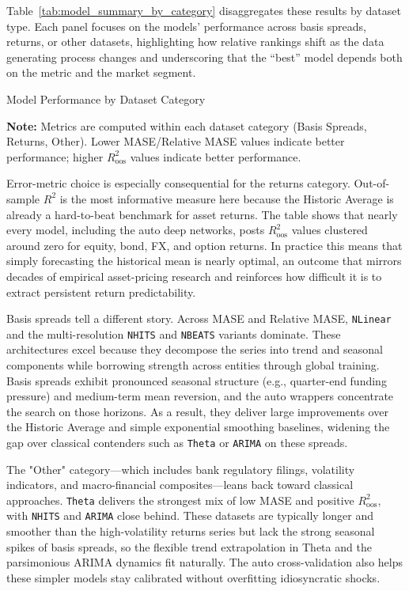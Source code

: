 \documentclass{article}
\begin{document}
Table~\ref{tab:model_summary_by_category} disaggregates these results by dataset type. Each panel focuses on the models' performance across basis spreads, returns, or other datasets, highlighting how relative rankings shift as the data generating process changes and underscoring that the ``best'' model depends both on the metric and the market segment.

\begin{table}[htbp]
\centering
\caption{Model Performance by Dataset Category}
\label{tab:model_summary_by_category}
\scriptsize

\caption*{\scriptsize \textbf{Note:} Metrics are computed within each dataset category (Basis Spreads, Returns, Other). Lower MASE/Relative MASE values indicate better performance; higher $R^2_{\text{oos}}$ values indicate better performance.}
\end{table}

Error-metric choice is especially consequential for the returns category. Out-of-sample $R^2$ is the most informative measure here because the Historic Average is already a hard-to-beat benchmark for asset returns. The table shows that nearly every model, including the auto deep networks, posts $R^2_{\text{oos}}$ values clustered around zero for equity, bond, FX, and option returns. In practice this means that simply forecasting the historical mean is nearly optimal, an outcome that mirrors decades of empirical asset-pricing research and reinforces how difficult it is to extract persistent return predictability.

Basis spreads tell a different story. Across MASE and Relative MASE, \texttt{NLinear} and the multi-resolution \texttt{NHITS} and \texttt{NBEATS} variants dominate. These architectures excel because they decompose the series into trend and seasonal components while borrowing strength across entities through global training. Basis spreads exhibit pronounced seasonal structure (e.g., quarter-end funding pressure) and medium-term mean reversion, and the auto wrappers concentrate the search on those horizons. As a result, they deliver large improvements over the Historic Average and simple exponential smoothing baselines, widening the gap over classical contenders such as \texttt{Theta} or \texttt{ARIMA} on these spreads.

The "Other" category—which includes bank regulatory filings, volatility indicators, and macro-financial composites—leans back toward classical approaches. \texttt{Theta} delivers the strongest mix of low MASE and positive $R^2_{\text{oos}}$, with \texttt{NHITS} and \texttt{ARIMA} close behind. These datasets are typically longer and smoother than the high-volatility returns series but lack the strong seasonal spikes of basis spreads, so the flexible trend extrapolation in Theta and the parsimonious ARIMA dynamics fit naturally. The auto cross-validation also helps these simpler models stay calibrated without overfitting idiosyncratic shocks.
\end{document}
